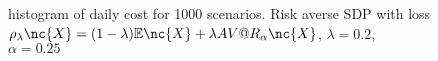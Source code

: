 \documentclass[10pt,a4paper]{article}
\begin{document}
\begin{figure}[h]
	\centering
	\quad
	\centering
	\caption{histogram of daily cost for 1000 scenarios. Risk averse SDP with loss $\rho_\lambda\nc{X} = (1-\lambda) \mathbb{E}\nc{X} + \lambda AV@R_\alpha\nc{X}$, $\lambda = 0.2$, $\alpha = 0.25$}	
	\label{f222}
\end{figure}



\end{document}
